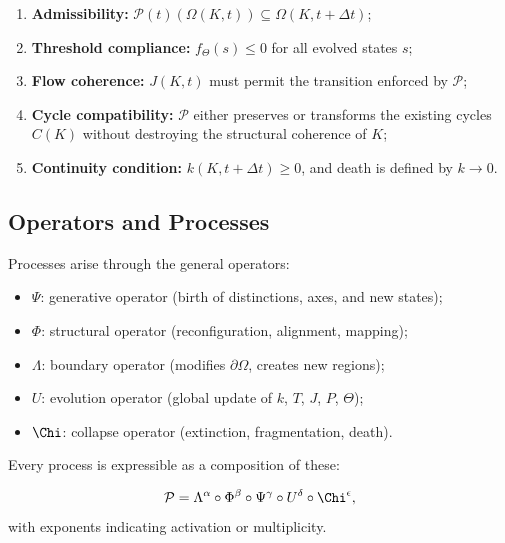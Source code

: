 \begin{enumerate}
    \item \textbf{Admissibility:}
    $\mathcal{P}(t)(\Omega(K,t)) \subseteq \Omega(K,t+\Delta t)$;

    \item \textbf{Threshold compliance:}
    $f_{\Theta}(s) \le 0$ for all evolved states $s$;

    \item \textbf{Flow coherence:}
    $J(K,t)$ must permit the transition enforced by $\mathcal{P}$;

    \item \textbf{Cycle compatibility:}
    $\mathcal{P}$ either preserves or transforms the existing cycles $C(K)$
    without destroying the structural coherence of $K$;

    \item \textbf{Continuity condition:}
    $k(K,t+\Delta t) \ge 0$, and death is defined by $k \to 0$.
\end{enumerate}

\subsection{Operators and Processes}

Processes arise through the general operators:

\begin{itemize}
    \item $\Psi$: generative operator (birth of distinctions, axes, and new states);
    \item $\Phi$: structural operator (reconfiguration, alignment, mapping);
    \item $\Lambda$: boundary operator (modifies $\partial\Omega$, creates new regions);
    \item $U$: evolution operator (global update of $k$, $T$, $J$, $P$, $\Theta$);
    \item $\Chi$: collapse operator (extinction, fragmentation, death).
\end{itemize}

Every process is expressible as a composition of these:

\[
\mathcal{P} =
\Lambda^{\alpha} \circ \Phi^{\beta} \circ \Psi^{\gamma}
\circ U^{\delta} \circ \Chi^{\epsilon},
\]
with exponents indicating activation or multiplicity.

